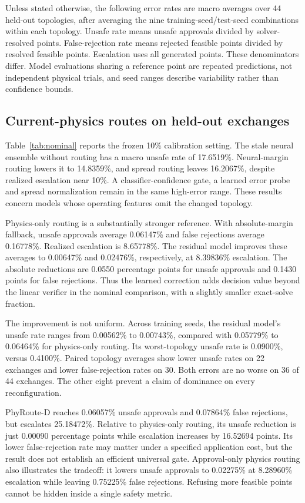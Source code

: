 Unless stated otherwise, the following error rates are macro averages over 44 held-out topologies, after averaging the nine training-seed/test-seed combinations within each topology. Unsafe rate means unsafe approvals divided by solver-resolved points. False-rejection rate means rejected feasible points divided by resolved feasible points. Escalation uses all generated points. These denominators differ. Model evaluations sharing a reference point are repeated predictions, not independent physical trials, and seed ranges describe variability rather than confidence bounds.

\subsection{Current-physics routes on held-out exchanges}

Table~\ref{tab:nominal} reports the frozen 10\% calibration setting. The stale neural ensemble without routing has a macro unsafe rate of 17.6519\%. Neural-margin routing lowers it to 14.8359\%, and spread routing leaves 16.2067\%, despite realized escalation near 10\%. A classifier-confidence gate, a learned error probe and spread normalization remain in the same high-error range. These results concern models whose operating features omit the changed topology.



Physics-only routing is a substantially stronger reference. With absolute-margin fallback, unsafe approvals average 0.06147\% and false rejections average 0.16778\%. Realized escalation is 8.65778\%. The residual model improves these averages to 0.00647\% and 0.02476\%, respectively, at 8.39836\% escalation. The absolute reductions are 0.0550 percentage points for unsafe approvals and 0.1430 points for false rejections. Thus the learned correction adds decision value beyond the linear verifier in the nominal comparison, with a slightly smaller exact-solve fraction.

The improvement is not uniform. Across training seeds, the residual model's unsafe rate ranges from 0.00562\% to 0.00743\%, compared with 0.05779\% to 0.06464\% for physics-only routing. Its worst-topology unsafe rate is 0.0900\%, versus 0.4100\%. Paired topology averages show lower unsafe rates on 22 exchanges and lower false-rejection rates on 30. Both errors are no worse on 36 of 44 exchanges. The other eight prevent a claim of dominance on every reconfiguration.

PhyRoute-D reaches 0.06057\% unsafe approvals and 0.07864\% false rejections, but escalates 25.18472\%. Relative to physics-only routing, its unsafe reduction is just 0.00090 percentage points while escalation increases by 16.52694 points. Its lower false-rejection rate may matter under a specified application cost, but the result does not establish an efficient universal gate. Approval-only physics routing also illustrates the tradeoff: it lowers unsafe approvals to 0.02275\% at 8.28960\% escalation while leaving 0.75225\% false rejections. Refusing more feasible points cannot be hidden inside a single safety metric.

